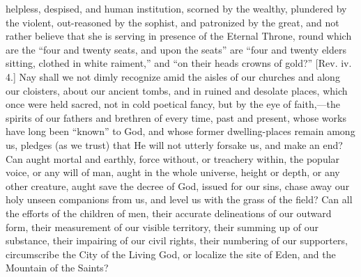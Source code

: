 helpless, despised, and human institution, scorned by the wealthy,
plundered by the violent, out-reasoned by the sophist, and patronized
by the great, and not rather believe that she is serving in presence
of the Eternal Throne, round which are the ``four and twenty
seats, and upon the seats'' are ``four and twenty elders
sitting, clothed in white raiment,'' and ``on their heads
crowns of gold?'' [Rev. iv. 4.] Nay shall we not dimly recognize
amid the aisles of our churches and along our cloisters, about our
ancient tombs, and in ruined and desolate places, which once were held
sacred, not in cold poetical fancy, but by the eye of faith,—the
spirits of our fathers and brethren of every time, past and present,
whose works have long been ``known'' to God, and whose former
dwelling-places remain among us, pledges (as we trust) that He will
not utterly forsake us, and make an end? Can aught mortal and earthly,
force without, or treachery within, the popular voice, or any will of
man, aught in the whole universe, height or depth, or any other
creature, aught save the decree of God, issued for our sins, chase
away our holy unseen companions from us, and level us with the grass
of the field? Can all the efforts of the children of men, their
accurate delineations of our outward form, their measurement of our
visible territory, their summing up of our substance, their impairing
of our civil rights, their numbering of our supporters, circumscribe
the City of the Living God, or localize the site of Eden, and the
Mountain of the Saints?

